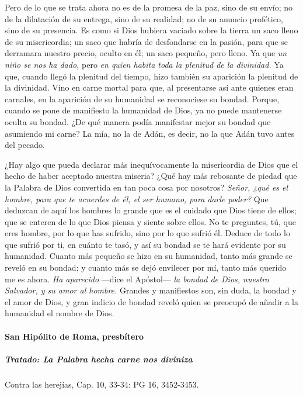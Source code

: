 \documentclass[]{article}
\let\oldparagraph\paragraph
\renewcommand{\paragraph}[1]{\oldparagraph{#1}\mbox{}}
\let\oldsubparagraph\subparagraph
\renewcommand{\subparagraph}[1]{\oldsubparagraph{#1}\mbox{}}
\begin{document}
Pero de lo que se trata ahora no es de la promesa de la paz, sino de su
envío; no de la dilatación de su entrega, sino de su realidad; no de su
anuncio profético, sino de su presencia. Es como si Dios hubiera vaciado
sobre la tierra un saco lleno de su misericordia; un saco que habría de
desfondarse en la pasión, para que se derramara nuestro precio, oculto
en él; un saco pequeño, pero lleno. Ya que \emph{un niño se nos ha
dado,} pero \emph{en quien habita toda la plenitud de la divinidad.} Ya
que, cuando llegó la plenitud del tiempo, hizo también su aparición la
plenitud de la divinidad. Vino en carne mortal para que, al presentarse
así ante quienes eran carnales, en la aparición de su humanidad se
reconociese su bondad. Porque, cuando se pone de manifiesto la humanidad
de Dios, ya no puede mantenerse oculta su bondad. ¿De qué manera podía
manifestar mejor su bondad que asumiendo mi carne? La mía, no la de
Adán, es decir, no la que Adán tuvo antes del pecado.

¿Hay algo que pueda declarar más inequívocamente la misericordia de Dios
que el hecho de haber aceptado nuestra miseria? ¿Qué hay más rebosante
de piedad que la Palabra de Dios convertida en tan poca cosa por
nosotros? \emph{Señor, ¿qué es el hombre, para que te acuerdes de él, el
ser humano, para darle poder?} Que deduzcan de aquí los hombres lo
grande que es el cuidado que Dios tiene de ellos; que se enteren de lo
que Dios piensa y siente sobre ellos. No te preguntes, tú, que eres
hombre, por lo que has sufrido, sino por lo que sufrió él. Deduce de
todo lo que sufrió por ti, en cuánto te tasó, y así su bondad se te hará
evidente por su humanidad. Cuanto más pequeño se hizo en su humanidad,
tanto más grande se reveló en su bondad; y cuanto más se dejó envilecer
por mí, tanto más querido me es ahora. \emph{Ha aparecido} ---dice el
Apóstol--- \emph{la bondad de Dios, nuestro Salvador, y su amor al
hombre.} Grandes y manifiestos son, sin duda, la bondad y el amor de
Dios, y gran indicio de bondad reveló quien se preocupó de añadir a la
humanidad el nombre de Dios.

\paragraph{San Hipólito de Roma,
presbítero}\label{san-hipuxf3lito-de-roma-presbuxedtero}

\subparagraph{Tratado: La Palabra hecha carne nos
diviniza}\label{tratado-la-palabra-hecha-carne-nos-diviniza}

Contra las herejías, Cap. 10, 33-34: PG 16, 3452-3453.
\end{document}
